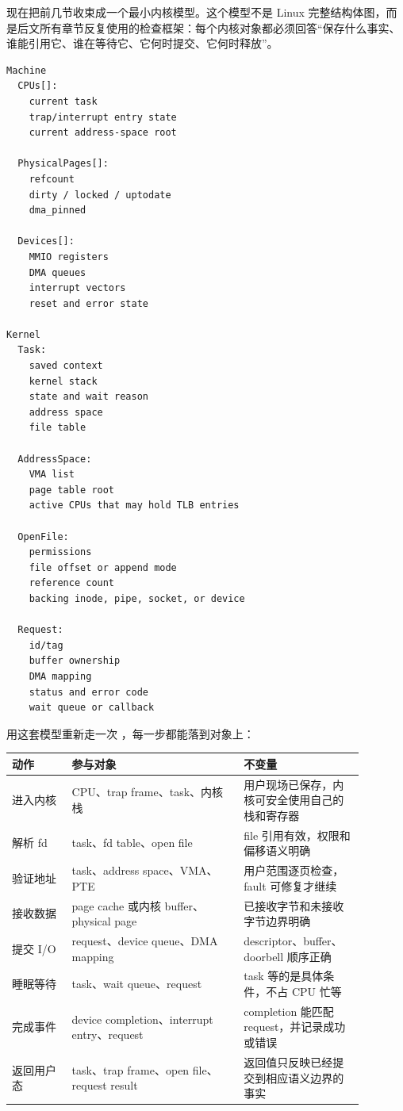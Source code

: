 现在把前几节收束成一个最小内核模型。这个模型不是 Linux 完整结构体图，而是后文所有章节反复使用的检查框架：每个内核对象都必须回答“保存什么事实、谁能引用它、谁在等待它、它何时提交、它何时释放”。

\begin{lstlisting}
Machine
  CPUs[]:
    current task
    trap/interrupt entry state
    current address-space root

  PhysicalPages[]:
    refcount
    dirty / locked / uptodate
    dma_pinned

  Devices[]:
    MMIO registers
    DMA queues
    interrupt vectors
    reset and error state

Kernel
  Task:
    saved context
    kernel stack
    state and wait reason
    address space
    file table

  AddressSpace:
    VMA list
    page table root
    active CPUs that may hold TLB entries

  OpenFile:
    permissions
    file offset or append mode
    reference count
    backing inode, pipe, socket, or device

  Request:
    id/tag
    buffer ownership
    DMA mapping
    status and error code
    wait queue or callback
\end{lstlisting}

用这套模型重新走一次 ，每一步都能落到对象上：

\begin{longtable}{p{0.15\linewidth}p{0.43\linewidth}p{0.3\linewidth}}
\toprule
动作 & 参与对象 & 不变量 \\
\midrule
进入内核 & CPU、trap frame、task、内核栈 & 用户现场已保存，内核可安全使用自己的栈和寄存器 \\
解析 fd & task、fd table、open file & file 引用有效，权限和偏移语义明确 \\
验证地址 & task、address space、VMA、PTE & 用户范围逐页检查，fault 可修复才继续 \\
接收数据 & page cache 或内核 buffer、physical page & 已接收字节和未接收字节边界明确 \\
提交 I/O & request、device queue、DMA mapping & descriptor、buffer、doorbell 顺序正确 \\
睡眠等待 & task、wait queue、request & task 等的是具体条件，不占 CPU 忙等 \\
完成事件 & device completion、interrupt entry、request & completion 能匹配 request，并记录成功或错误 \\
返回用户态 & task、trap frame、open file、request result & 返回值只反映已经提交到相应语义边界的事实 \\
\bottomrule
\end{longtable}

